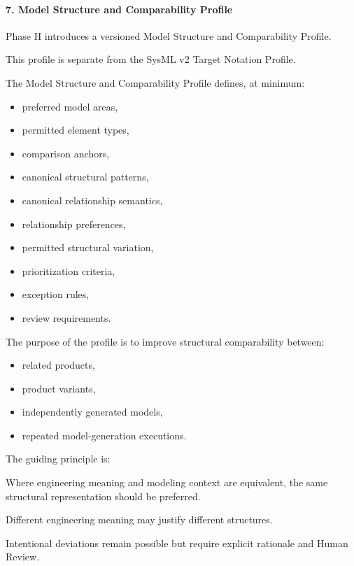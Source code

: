 \hypertarget{7-model-structure-and-comparability-profile}{%
\paragraph{7. Model Structure and Comparability Profile}\label{7-model-structure-and-comparability-profile}}

Phase H introduces a versioned Model Structure and Comparability Profile.

This profile is separate from the SysML v2 Target Notation Profile.

The Model Structure and Comparability Profile defines, at minimum:

\begin{itemize}
\tightlist
\item
  preferred model areas,
\item
  permitted element types,
\item
  comparison anchors,
\item
  canonical structural patterns,
\item
  canonical relationship semantics,
\item
  relationship preferences,
\item
  permitted structural variation,
\item
  prioritization criteria,
\item
  exception rules,
\item
  review requirements.
\end{itemize}

The purpose of the profile is to improve structural comparability between:

\begin{itemize}
\tightlist
\item
  related products,
\item
  product variants,
\item
  independently generated models,
\item
  repeated model-generation executions.
\end{itemize}

The guiding principle is:

Where engineering meaning and modeling context are equivalent, the same structural representation should be preferred.

Different engineering meaning may justify different structures.

Intentional deviations remain possible but require explicit rationale and Human Review.

